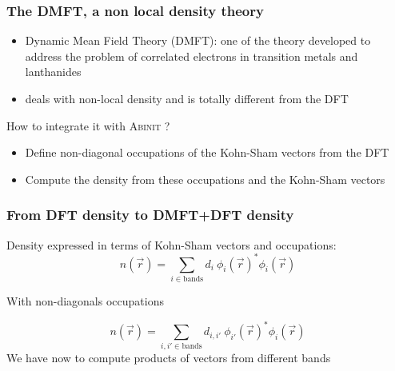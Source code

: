 \begin{frame}
  \frametitle{The DMFT, a non local density theory}
  \begin{itemize}
    \item Dynamic Mean Field Theory (DMFT): one of the theory developed
  to address the problem of correlated electrons in transition metals 
  and lanthanides
    \item deals with non-local density and is totally different from the DFT
  \end{itemize}
  How to integrate it with \textsc{Abinit} ?
  \begin{itemize}
    \item Define non-diagonal occupations of the Kohn-Sham vectors from the DFT
    \item Compute the density from these occupations and the Kohn-Sham vectors
  \end{itemize}
\end{frame}

\begin{frame}
  \frametitle{From DFT density to DMFT+DFT density}
  Density expressed in terms of Kohn-Sham vectors and occupations:
  \begin{equation}
    n(\vec{r}) = \sum_{i \in \text{bands}} d_i~\phi_i(\vec{r})^* \phi_i(\vec{r})
    \label{eq:dft_density}
  \end{equation}

  With non-diagonals occupations

  \begin{equation}
    n(\vec{r}) = \sum_{i, i' \in \text{bands}} d_{i,i'}~\phi_{i'}(\vec{r})^* \phi_i(\vec{r})
    \label{eq:dmft_density}
  \end{equation}
  \alert{We have now to compute products of vectors from different bands}
\end{frame}
